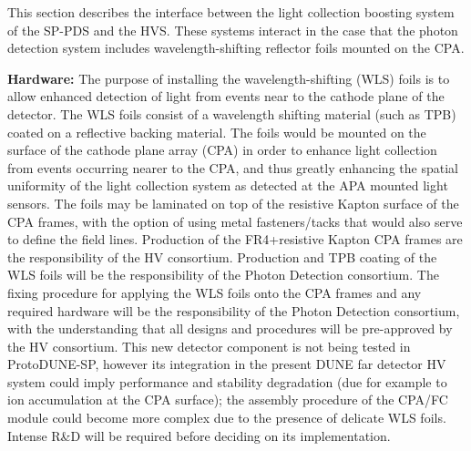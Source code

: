 

This section describes the interface between the light collection boosting system of the SP-PDS  and the HVS. These systems interact in the case that the photon detection system includes wavelength-shifting reflector foils mounted on the CPA.

\textbf{Hardware: }The purpose of installing the wavelength-shifting (WLS) foils is to allow enhanced detection of light from events near to the cathode plane of the detector. The WLS foils consist of a wavelength shifting material (such as TPB) coated on a reflective backing material. The foils would be mounted on the surface of the cathode plane array (CPA) in order to enhance light collection from events occurring nearer to the CPA, and thus greatly enhancing the spatial uniformity of the light collection system as detected at the APA mounted light sensors. The foils may be laminated on top of the resistive Kapton surface of the CPA frames, with the option of using metal fasteners/tacks that would also serve to define the field lines. Production of the FR4+resistive Kapton CPA frames are the responsibility of the HV consortium. Production and TPB coating of the WLS foils will be the responsibility of the Photon Detection consortium. The fixing procedure for applying the WLS foils onto the CPA frames and any required hardware will be the responsibility of the Photon Detection consortium, with the understanding that all designs and procedures will be pre-approved by the HV consortium. This new detector component is not being tested in ProtoDUNE-SP, however its integration in the present DUNE far detector HV system could imply performance and stability degradation (due for example to ion accumulation at the CPA surface); the assembly procedure of the CPA/FC module could become more complex due to the presence of delicate WLS foils. Intense R\&D will be required before deciding on its implementation.

